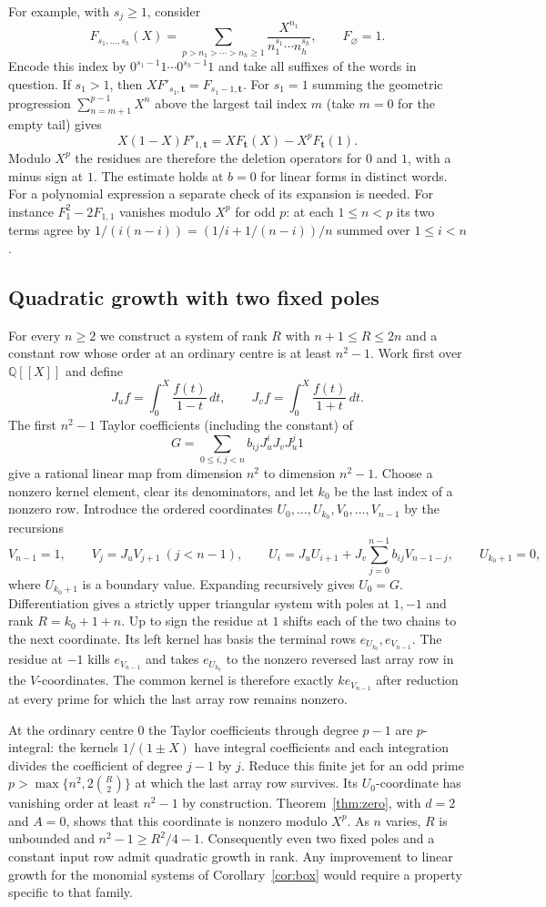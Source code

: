 For example, with $s_j\ge1$, consider
\[
 F_{s_1,\ldots,s_h}(X)=
 \sum_{p>n_1>\cdots>n_h\ge1}
 \frac{X^{n_1}}{n_1^{s_1}\cdots n_h^{s_h}},\qquad F_{\varnothing}=1 .
\]
Encode this index by $0^{s_1-1}1\cdots0^{s_h-1}1$ and take all suffixes
of the words in question. If $s_1>1$, then
$XF'_{s_1,\mathbf t}=F_{s_1-1,\mathbf t}$. For $s_1=1$ summing the
geometric progression $\sum_{n=m+1}^{p-1}X^n$ above the largest tail
index $m$ (take $m=0$ for the empty tail) gives
\[
 X(1-X)F'_{1,\mathbf t}=XF_{\mathbf t}(X)-X^p F_{\mathbf t}(1).
\]
Modulo $X^p$ the residues are therefore the deletion operators for $0$
and $1$, with a minus sign at $1$. The estimate holds at $b=0$ for
linear forms in distinct words. For a polynomial expression a separate
check of its expansion is needed. For instance $F_1^2-2F_{1,1}$ vanishes
modulo $X^p$ for odd $p$: at each $1\le n<p$ its two terms agree by
$1/(i(n-i))=(1/i+1/(n-i))/n$ summed over $1\le i<n$.

\subsection{Quadratic growth with two fixed poles}
For every $n\ge2$ we construct a system of rank $R$ with
$n+1\le R\le 2n$ and a constant row whose order at an ordinary centre
is at least $n^2-1$. Work first over $\mathbb Q[[X]]$ and define
\[
 J_u f=\int_0^X\frac{f(t)}{1-t}\,dt,\qquad
 J_v f=\int_0^X\frac{f(t)}{1+t}\,dt .
\]
The first $n^2-1$ Taylor coefficients (including the constant) of
\[
 G=\sum_{0\le i,j<n} b_{ij}J_u^iJ_vJ_u^j1
\]
give a rational linear map from dimension $n^2$ to dimension $n^2-1$.
Choose a nonzero kernel element, clear its denominators, and let $k_0$
be the last index of a nonzero row. Introduce the ordered coordinates
$U_0,\ldots,U_{k_0},V_0,\ldots,V_{n-1}$ by the recursions
\[
 V_{n-1}=1,\qquad V_j=J_uV_{j+1}\ (j<n-1),\qquad
 U_i=J_uU_{i+1}+J_v\sum_{j=0}^{n-1}b_{ij}V_{n-1-j},\qquad U_{k_0+1}=0,
\]
where $U_{k_0+1}$ is a boundary value. Expanding recursively gives
$U_0=G$. Differentiation gives a strictly upper triangular system with
poles at $1,-1$ and rank $R=k_0+1+n$. Up to sign the residue at $1$
shifts each of the two chains to the next coordinate. Its left kernel
has basis the terminal rows $e_{U_{k_0}},e_{V_{n-1}}$. The residue at
$-1$ kills $e_{V_{n-1}}$ and takes $e_{U_{k_0}}$ to the nonzero
reversed last array row in the $V$-coordinates. The common kernel is
therefore exactly $k e_{V_{n-1}}$ after reduction at every prime for
which the last array row remains nonzero.

At the ordinary centre $0$ the Taylor coefficients through degree $p-1$
are $p$-integral: the kernels $1/(1\pm X)$ have integral coefficients
and each integration divides the coefficient of degree $j-1$ by $j$.
Reduce this finite jet for an odd prime $p>\max\{n^2,2\binom R2\}$ at
which the last array row survives. Its $U_0$-coordinate has vanishing
order at least $n^2-1$ by construction. Theorem~\ref{thm:zero}, with
$d=2$ and $A=0$, shows that this coordinate is nonzero modulo $X^p$.
As $n$ varies, $R$ is unbounded and $n^2-1\ge R^2/4-1$. Consequently
even two fixed poles and a constant input row admit quadratic growth
in rank. Any improvement to linear growth for the monomial systems of
Corollary~\ref{cor:box} would require a property specific to that family.
